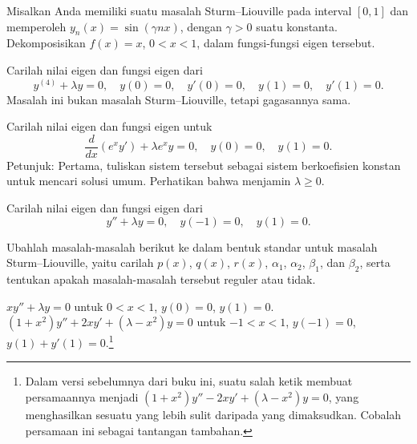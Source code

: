 \begin{exercise}
Misalkan Anda memiliki suatu masalah Sturm--Liouville pada interval
$[0,1]$ dan memperoleh
$y_n(x) = \sin (\gamma n x)$, dengan $\gamma > 0$ suatu konstanta.
Dekomposisikan $f(x) = x$, $0 < x < 1$, dalam fungsi-fungsi eigen tersebut.
\end{exercise}

\begin{exercise}
Carilah nilai eigen dan fungsi eigen dari
\begin{equation*}
y^{(4)}+\lambda y = 0, \quad y(0) = 0, \quad y'(0) = 0, \quad y(1) = 0, \quad
y'(1) = 0 .
\end{equation*}
Masalah ini bukan masalah Sturm--Liouville, tetapi gagasannya sama.
\end{exercise}

\begin{exercise}
Carilah nilai eigen dan fungsi eigen untuk
\begin{equation*}
\frac{d}{dx} (e^x y') + \lambda e^x y = 0, \quad y(0) = 0, \quad y(1) = 0 .
\end{equation*}
Petunjuk: Pertama, tuliskan sistem tersebut sebagai sistem berkoefisien konstan untuk mencari
solusi umum.  Perhatikan bahwa  menjamin $\lambda \geq 0$.
\end{exercise}

\setcounter{exercise}{100}

\begin{exercise}
Carilah nilai eigen dan fungsi eigen dari
\begin{equation*}
y'' + \lambda y = 0, \quad y(-1) = 0, \quad y(1) = 0 .
\end{equation*}
\end{exercise}

\begin{exercise}
Ubahlah masalah-masalah berikut ke dalam bentuk standar untuk masalah
Sturm--Liouville, yaitu carilah $p(x)$, $q(x)$, $r(x)$,
$\alpha_1$,
$\alpha_2$,
$\beta_1$, dan
$\beta_2$,
serta tentukan apakah masalah-masalah tersebut reguler atau tidak.
\begin{tasks}
\task $x y'' + \lambda y = 0$
\enspace untuk $0 < x < 1$,
\enspace $y(0) = 0$,
\enspace $y(1) = 0$.
\task
$(1+x^2) y'' + 2xy' + (\lambda-x^2) y = 0$
\enspace untuk $-1 < x < 1$,
\enspace $y(-1) = 0$,
\enspace $y(1)+y'(1) = 0$.\footnote{%
Dalam versi sebelumnya dari buku ini, suatu salah ketik membuat persamaannya
menjadi $(1+x^2) y'' - 2xy' + (\lambda-x^2) y = 0$, yang menghasilkan sesuatu
yang lebih sulit daripada yang dimaksudkan.  Cobalah persamaan ini sebagai tantangan tambahan.}
\end{tasks}
\end{exercise}

